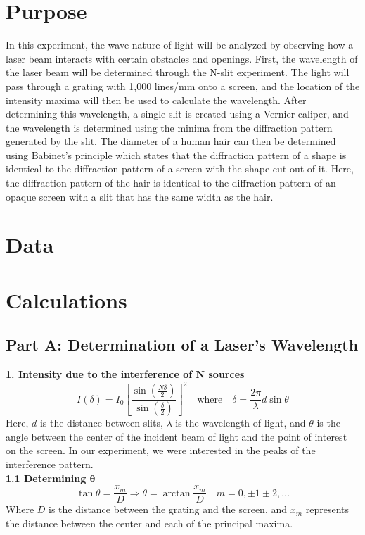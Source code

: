 \documentclass[12pt]{article}
\begin{document}

\newpage
\tableofcontents
\newpage
\section{Purpose}
In this experiment, the wave nature of light will be analyzed by observing how a laser beam interacts with certain obstacles and openings.
First, the wavelength of the laser beam will be determined through the N-slit experiment.
The light will pass through a grating with 1,000 lines/mm onto a screen, and the location of the intensity maxima will then be used to calculate the wavelength. 
After determining this wavelength, a single slit is created using a Vernier caliper, and the wavelength is determined using the minima from the diffraction pattern generated by the slit.
The diameter of a human hair can then be determined using Babinet's principle which states that the diffraction pattern of a shape is identical to the diffraction pattern of a screen with the shape cut out of it. 
Here, the diffraction pattern of the hair is identical to the diffraction pattern of an opaque screen with a slit that has the same width as the hair. 
\newpage
\section{Data}

\newpage
\section{Calculations}
\subsection*{Part A: Determination of a Laser's Wavelength}
\noindent \textbf{1. Intensity due to the interference of $\bm{N}$ sources}\[I(\delta)=I_0\left[\frac{\sin(\frac{N\delta}{2})}{\sin(\frac{\delta}{2})}\right]^2 \quad \text{where} \quad \delta=\frac{2\pi}{\lambda}d\sin\theta\]
Here, $d$ is the distance between slits, $\lambda$ is the wavelength of light, and $\theta$ is the angle between the center of the incident beam of light and the point of interest on the screen. 
In our experiment, we were interested in the peaks of the interference pattern.\\
\textbf{1.1 Determining $\bm{\theta}$}\[\tan\theta=\frac{x_m}{D}\Rightarrow\theta=\arctan\frac{x_m}{D} \quad m=0,\pm1\pm2,\dots\]
Where $D$ is the distance between the grating and the screen, and $x_m$ represents the distance between the center and each of the principal maxima.
\end{document}
